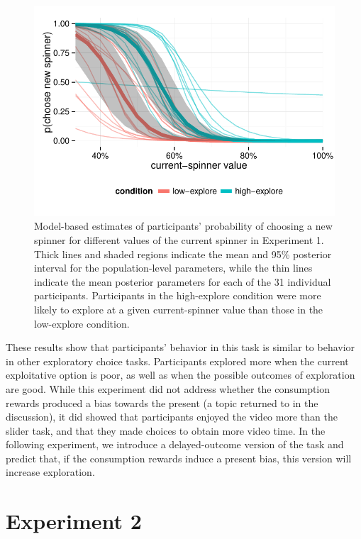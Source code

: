 \documentclass[10pt,letterpaper]{article}
\begin{document}
\begin{figure}
\centering
\includegraphics[width=\columnwidth]{figures/exp1results.pdf}
\caption{Model-based estimates of participants' probability of choosing a new
  spinner for different values of the current spinner in Experiment 1. Thick
  lines and shaded regions indicate the mean and 95\% posterior interval for the
  population-level parameters, while the thin lines indicate the mean posterior
  parameters for each of the 31 individual participants. Participants in the
  high-explore condition were more
  likely to explore at a given current-spinner value than those in the
  low-explore condition.}
\label{fig:exp1results}
\end{figure}

These results show that participants' behavior in this task is
similar to behavior in other exploratory choice tasks. Participants explored more
when the current exploitative option is poor, as well as when the possible
outcomes of exploration are good. While this experiment did not address whether the
consumption rewards produced a bias towards the present (a topic returned to in the
discussion), it did showed that participants enjoyed the video more than the slider
task, and that they made choices to obtain more video time. In the following
experiment, we introduce a delayed-outcome version of the task and predict that, if the
consumption rewards induce a present bias, this version will increase exploration.

\section{Experiment 2}
\end{document}
